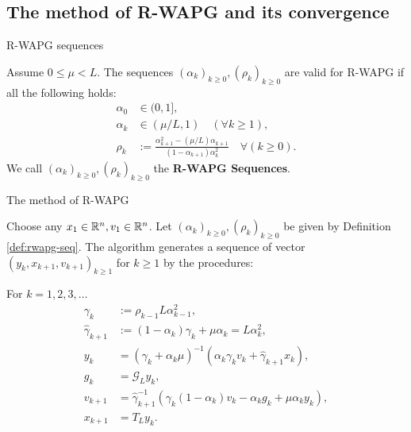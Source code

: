 \documentclass[11pt]{beamer}
\theoremstyle{definition}
\begin{document}
    \subsection{The method of R-WAPG and its convergence}
        \begin{frame}{R-WAPG sequences}
            \begin{definition}\label{def:rwapg-seq}
                Assume $0 \le \mu < L$. 
                The sequences $(\alpha_k)_{k \ge 0}, (\rho_k)_{k \ge 0}$ are valid for R-WAPG if all the following holds: 
                \begin{align*}
                    \alpha_0 &\in (0, 1], 
                    \\
                    \alpha_k &\in (\mu/L, 1) \quad (\forall k \ge 1), 
                    \\
                    \rho_k &:= \frac{\alpha_{k + 1}^2 - (\mu/L)\alpha_{k + 1}}{(1 - \alpha_{k + 1})\alpha_k^2} \quad \forall (k \ge 0). 
                \end{align*}
                We call $(\alpha_k)_{k \ge 0}, (\rho_k)_{k \ge 0}$ the \textbf{R-WAPG Sequences}. 
            \end{definition}
        \end{frame}
        \begin{frame}{The method of R-WAPG}
            \begin{definition}\label{def:wapg}
                Choose any $x_1 \in \mathbb R^n, v_1 \in \mathbb R^n$. 
                Let $(\alpha_k)_{k \ge0}, (\rho_k)_{k \ge 0}$ be given by Definition \ref{def:rwapg-seq}. 
                The algorithm generates a sequence of vector $(y_k, x_{k + 1}, v_{k + 1})_{k \ge 1}$ for $k\ge 1$ by the procedures:  
                \begin{tcolorbox}
                    For $k=1, 2, 3, \ldots$
                    \begin{align*}
                        \gamma_k &:= \rho_{k -1}L\alpha_{k - 1}^2, 
                        \\
                        \hat \gamma_{k + 1} & := (1 - \alpha_k)\gamma_k + \mu \alpha_k = L\alpha_k^2, 
                        \\
                        y_k &= 
                        (\gamma_k + \alpha_k \mu)^{-1}(\alpha_k \gamma_k v_k + \hat\gamma_{k + 1} x_k), 
                        \\
                        g_k &= \mathcal G_L y_k, 
                        \\
                        v_{k + 1} &= 
                        \hat\gamma^{-1}_{k + 1}
                        (\gamma_k(1 - \alpha_k) v_k - \alpha_k g_k + \mu \alpha_k y_k), 
                        \\
                        x_{k + 1} &= T_L y_k. 
                    \end{align*}    
                \end{tcolorbox}
            \end{definition}
        \end{frame}
\end{document}
